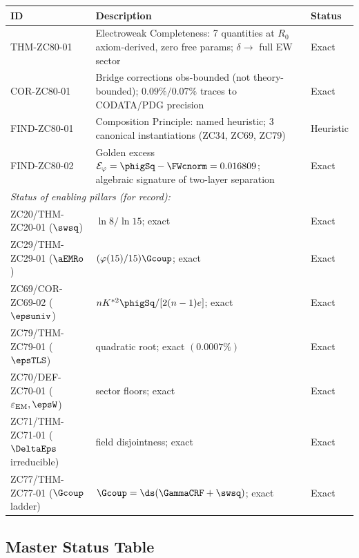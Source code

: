 \documentclass[12pt, a4paper]{article}
\renewcommand{\epsEM}{\varepsilon_{\rm EM}}
\begin{document}
\begin{formalbox}[title={Atomic Registry --- ZC80}]
\begin{center}
\renewcommand{\arraystretch}{1.3}
\scriptsize
\begin{tabular}{lp{7.5cm}l}
\toprule
\textbf{ID} & \textbf{Description} & \textbf{Status} \\
\midrule
THM-ZC80-01
  & Electroweak Completeness: 7 quantities at $R_0$
    axiom-derived, zero free params; $\delta \to$ full EW sector
  & Exact \\[3pt]
COR-ZC80-01
  & Bridge corrections obs-bounded (not theory-bounded);
    $0.09\%/0.07\%$ traces to CODATA/PDG precision
  & Exact \\[3pt]
FIND-ZC80-01
  & Composition Principle: named heuristic; 3 canonical
    instantiations (ZC34, ZC69, ZC79)
  & Heuristic \\[3pt]
FIND-ZC80-02
  & Golden excess $\mathcal{E}_\varphi = \phigSq - \FWcnorm
    = 0.016809$; algebraic signature of two-layer separation
  & Exact \\[3pt]
\midrule
\multicolumn{3}{l}{\textit{Status of enabling pillars (for record):}} \\[2pt]
ZC20/THM-ZC20-01 ($\swsq$)
  & $\ln8/\ln15$; exact & Exact \\[2pt]
ZC29/THM-ZC29-01 ($\aEMRo$)
  & $(\varphi(15)/15)\Gcoup$; exact & Exact \\[2pt]
ZC69/COR-ZC69-02 ($\epsuniv$)
  & $nK^{*2}\phigSq/[2(n-1)e]$; exact & Exact \\[2pt]
ZC79/THM-ZC79-01 ($\epsTLS$)
  & quadratic root; exact $(0.0007\%)$ & Exact \\[2pt]
ZC70/DEF-ZC70-01 ($\epsEM,\epsW$)
  & sector floors; exact & Exact \\[2pt]
ZC71/THM-ZC71-01 ($\DeltaEps$ irreducible)
  & field disjointness; exact & Exact \\[2pt]
ZC77/THM-ZC77-01 ($\Gcoup$ ladder)
  & $\Gcoup = \ds(\GammaCRF + \swsq)$; exact & Exact \\
\bottomrule
\end{tabular}
\end{center}
\end{formalbox}

\subsection{Master Status Table}
\label{sec:status}
\end{document}
